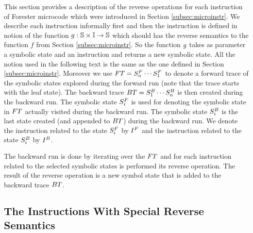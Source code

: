 This section provides a description of the reverse operations for
each instruction of Forester microcode which were introduced in Section \ref{subsec:microinstr}.
We describe each instruction informally first and then the instruction is defined in notion
of the function $g: \mathbb{S} \times \mathbb{I} \rightarrow \mathbb{S}$ which should has the reverse semantics to the function $f$ from Section \ref{subsec:microinstr}.
So the function $g$ takes as parameter a symbolic state and an instruction and returns a new symbolic state.
All the notion used in the following text is the same as the one defined in Section \ref{subsec:microinstr}.
Moreover we use $FT = S^{F}_n \cdots S^{F}_1$ to denote a forward trace of the symbolic states explored during
the forward run (note that the trace starts with the leaf state).
The backward trace $BT = S^{B}_1 \cdots S^{B}_n$ is then created during the backward run.
The symbolic state $S^{F}_{i}$ is used for denoting the symbolic state in $FT$ actually visited during the backward run.
The symbolic state $S^{B}_{i}$ is the last state created (and appended to $BT$) during the backward run.
We denote the instruction related to the state $S^{F}_{i}$ by $I^{F}$
and the instruction related to the state $S^{B}_{i}$ by $I^{B}$.

The backward run is done by iterating over the $FT$ and for each
instruction related to the selected symbolic states is performed its
reverse operation.
The result of the reverse operation is a new symbol state that is
added to the backward trace $BT$.

\subsection{The Instructions With Special Reverse Semantics}

